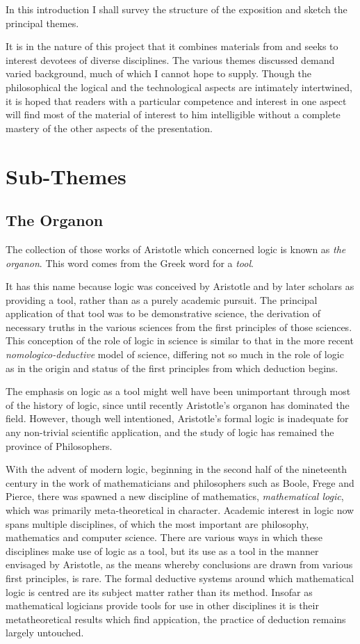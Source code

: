 In this introduction I shall survey the structure of the exposition
and sketch the principal themes.

It is in the nature of this project that it combines materials from
and seeks to interest devotees of diverse disciplines.
The various themes discussed demand varied background, much of which I
cannot hope to supply.
Though the philosophical the logical and the technological aspects are
intimately intertwined, it is hoped that readers with a particular
competence and interest in one aspect will find most of the material
of interest to him intelligible without a complete mastery of the
other aspects of the presentation.

\section{Sub-Themes}

\subsection{The Organon}

The collection of those works of Aristotle which concerned logic is
known as \emph{the organon}.
This word comes from the Greek word for a \emph{tool}.

It has this name because logic was conceived by Aristotle and by later
scholars as providing a tool, rather than as a purely academic
pursuit.
The principal application of that tool was to be demonstrative
science, the derivation of necessary truths in the various sciences
from the first principles of those sciences.
This conception of the role of logic in science is similar to that
in the more recent \emph{nomologico-deductive} model of science,
differing not so much in the role of logic as in the origin and
status of the first principles from which deduction begins.
 
The emphasis on logic as a tool might well have been unimportant
through most of the history of logic, since until recently Aristotle's
organon has dominated the field.
However, though well intentioned, Aristotle's formal logic is
inadequate for any non-trivial scientific application, and the study
of logic has remained the province of Philosophers.

With the advent of modern logic, beginning in the second half of the
nineteenth century in the work of mathematicians and philosophers such as Boole,
Frege and Pierce, there was spawned a new discipline of mathematics,
\emph{mathematical logic}, which was primarily meta-theoretical in
character.
Academic interest in logic now spans multiple disciplines, of which
the most important are philosophy, mathematics and computer science.
There are various ways in which these disciplines make use of
logic as a tool, but its use as a tool in the manner envisaged by
Aristotle, as the means whereby conclusions are drawn from various
first principles, is rare.
The formal deductive systems around which mathematical logic is centred
are its subject matter rather than its method.
Insofar as mathematical logicians provide tools for use in other
disciplines it is their metatheoretical results which find 
appication, the practice of deduction remains largely untouched.

